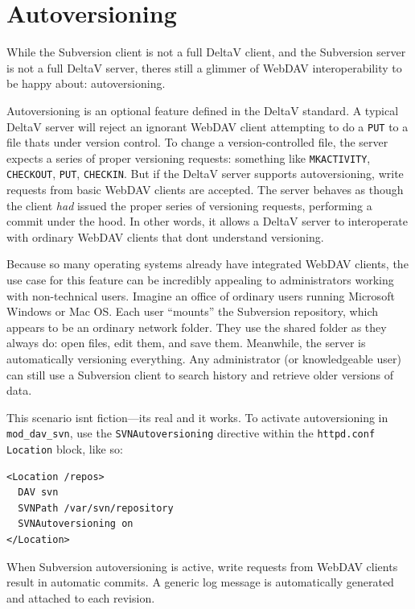\section{Autoversioning}\label{svn.webdav.autoversioning}

While the Subversion client is not a full DeltaV client, and the
Subversion server is not a full DeltaV server, there\textquotesingle s
still a glimmer of WebDAV interoperability to be happy about:
autoversioning.

Autoversioning is an optional feature defined in the DeltaV standard. A
typical DeltaV server will reject an ignorant WebDAV client attempting
to do a \texttt{PUT} to a file that\textquotesingle s under version
control. To change a version-controlled file, the server expects a
series of proper versioning requests: something like
\texttt{MKACTIVITY}, \texttt{CHECKOUT}, \texttt{PUT}, \texttt{CHECKIN}.
But if the DeltaV server supports autoversioning, write requests from
basic WebDAV clients are accepted. The server behaves as though the
client \emph{had} issued the proper series of versioning requests,
performing a commit under the hood. In other words, it allows a DeltaV
server to interoperate with ordinary WebDAV clients that
don\textquotesingle t understand versioning.

Because so many operating systems already have integrated WebDAV
clients, the use case for this feature can be incredibly appealing to
administrators working with non-technical users. Imagine an office of
ordinary users running Microsoft Windows or Mac OS. Each user ``mounts''
the Subversion repository, which appears to be an ordinary network
folder. They use the shared folder as they always do: open files, edit
them, and save them. Meanwhile, the server is automatically versioning
everything. Any administrator (or knowledgeable user) can still use a
Subversion client to search history and retrieve older versions of data.

This scenario isn\textquotesingle t fiction---it\textquotesingle s real
and it works. To activate autoversioning in \texttt{mod\_dav\_svn}, use
the \texttt{SVNAutoversioning} directive within the \texttt{httpd.conf}
\texttt{Location} block, like so:

\begin{verbatim}
<Location /repos>
  DAV svn
  SVNPath /var/svn/repository
  SVNAutoversioning on
</Location>
\end{verbatim}

When Subversion autoversioning is active, write requests from WebDAV
clients result in automatic commits. A generic log message is
automatically generated and attached to each revision.

